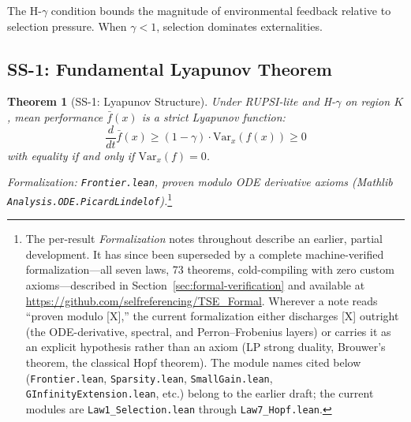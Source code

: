 \documentclass[12pt]{article}
\newtheorem{theorem}{Theorem}[section]
\newcommand{\Var}{\mathrm{Var}}
\begin{document}
The H-$\gamma$ condition bounds the magnitude of environmental feedback relative to selection pressure. When $\gamma < 1$, selection dominates externalities.

\subsection{SS-1: Fundamental Lyapunov Theorem}

\begin{theorem}[SS-1: Lyapunov Structure]
\label{thm:ss1}
Under RUPSI-lite and H-$\gamma$ on region $K$, mean performance $\bar{f}(x)$ is a strict Lyapunov function:
\[
\frac{d}{dt} \bar{f}(x) \geq (1 - \gamma) \cdot \Var_x(f(x)) \geq 0
\]
with equality if and only if $\Var_x(f) = 0$.
\end{theorem}
\noindent\textit{Formalization: \texttt{Frontier.lean}, proven modulo ODE derivative axioms (Mathlib \texttt{Analysis.ODE.PicardLindelof}).}\footnote{\label{fn:formal}The per-result \textit{Formalization} notes throughout describe an earlier, partial development. It has since been superseded by a complete machine-verified formalization---all seven laws, 73 theorems, cold-compiling with zero custom axioms---described in Section~\ref{sec:formal-verification} and available at \url{https://github.com/selfreferencing/TSE_Formal}. Wherever a note reads ``proven modulo [X],'' the current formalization either discharges [X] outright (the ODE-derivative, spectral, and Perron--Frobenius layers) or carries it as an explicit hypothesis rather than an axiom (LP strong duality, Brouwer's theorem, the classical Hopf theorem). The module names cited below (\texttt{Frontier.lean}, \texttt{Sparsity.lean}, \texttt{SmallGain.lean}, \texttt{GInfinityExtension.lean}, etc.) belong to the earlier draft; the current modules are \texttt{Law1\_Selection.lean} through \texttt{Law7\_Hopf.lean}.}
\end{document}

